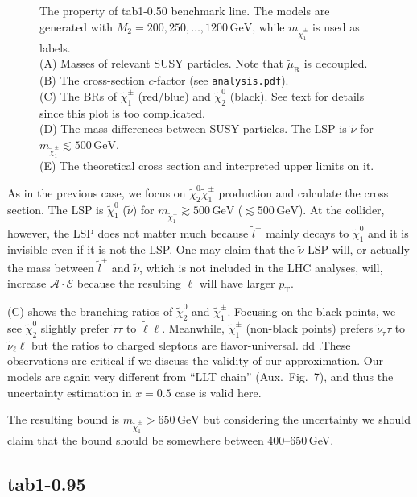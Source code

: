 \documentclass[a4paper,10pt,captions=tableheading,DIV=14]{scrartcl}
\numberwithin{equation}{section}
\newcommand\w[1]{_{\mathrm{#1}}}
\newcommand\unit[1]{\,\mathrm{#1}\xspace}
\newcommand\GeV{\unit{GeV}}
\newcommand\neut  [1][\relax]{{\tilde\chi^0_{#1}}}
\newcommand\charPM[1][\relax]{{\tilde\chi^\pm_{#1}}}
\begin{document}
\begin{figure}[h]
  \caption{\label{fig:tab1x005}The property of tab1-0.50 benchmark line. The models are generated with $M_2=200,250,\dots,1200\GeV$, while $m_{\charPM[1]}$ is used as labels.\\
 (A) Masses of relevant SUSY particles. Note that $\tilde\mu\w R$ is decoupled.\\
 (B) The cross-section $c$-factor (see \texttt{analysis.pdf}).\\
 (C) The BRs of $\charPM[1]$ (red/blue) and $\neut[2]$ (black). See text for details since this plot is too complicated.\\
 (D) The mass differences between SUSY particles. The LSP is  $\tilde\nu$ for $m_{\charPM[1]}\lesssim 500\GeV$.\\
 (E) The theoretical cross section and interpreted upper limits on it.
}
\end{figure}


As in the previous case, we focus on $\neut[2]\charPM[1]$ production and calculate the cross section.
The LSP is $\neut[1]$ ($\tilde\nu$) for $m_{\charPM[1]}\gtrsim500\GeV$ ($\lesssim500\GeV$).
At the collider, however, the LSP does not matter much because $\tilde l^\pm$ mainly decays to $\neut[1]$ and it is invisible even if it is not the LSP.
One may claim that the $\tilde\nu$-LSP will, or actually the mass between $\tilde l^\pm$ and $\tilde\nu$, which is not included in the LHC analyses, will, increase $\mathcal A\cdot\mathcal E$ because the resulting $\ell$ will have larger $p\w T$.

 (C) shows the branching ratios of $\neut[2]$ and $\charPM[1]$.
Focusing on the black points, we see $\neut[2]$ slightly prefer $\tilde\tau\tau$ to $\tilde\ell\ell$.
Meanwhile, $\charPM[1]$ (non-black points) prefers $\tilde\nu_\tau\tau$ to $\tilde\nu_\ell\ell$ but the ratios to charged sleptons are flavor-universal.
dd .These observations are critical if we discuss the validity of our approximation.
Our models are again very different from ``LLT chain'' (Aux.~Fig.~7), and thus the uncertainty estimation in $x=0.5$ case is valid here.

The resulting bound is $m_{\charPM[1]}>650\GeV$ but considering the uncertainty we should claim that the bound should be somewhere between 400--650\,GeV.


\clearpage

\subsection{tab1-0.95}
\end{document}
